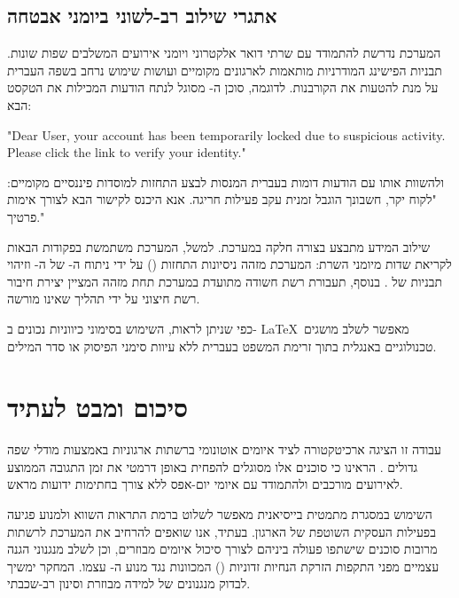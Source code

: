 \documentclass[11pt,a4paper]{article}
\begin{document}
\subsection{אתגרי שילוב רב-לשוני ביומני אבטחה}
המערכת נדרשת להתמודד עם שרתי דואר אלקטרוני ויומני אירועים המשלבים שפות שונות. תבניות הפישינג המודרניות מותאמות לארגונים מקומיים ועושות שימוש נרחב בשפה העברית על מנת להטעות את הקורבנות. לדוגמה, סוכן ה- מסוגל לנתח הודעות המכילות את הטקסט הבא:
\begin{otherlanguage}{english}
"Dear User, your account has been temporarily locked due to suspicious activity. Please click the link to verify your identity."
\end{otherlanguage}
ולהשוות אותו עם הודעות דומות בעברית המנסות לבצע התחזות למוסדות פיננסיים מקומיים:
"לקוח יקר, חשבונך הוגבל זמנית עקב פעילות חריגה. אנא היכנס לקישור הבא לצורך אימות פרטיך."

שילוב המידע מתבצע בצורה חלקה במערכת. למשל, המערכת משתמשת בפקודות הבאות לקריאת שדות מיומני השרת:
המערכת מזהה ניסיונות התחזות () על ידי ניתוח ה- של ה- וזיהוי תבניות של . בנוסף, תעבורת רשת חשודה מתועדת במערכת  תחת מזהה  המציין יצירת חיבור רשת חיצוני על ידי תהליך שאינו מורשה.

כפי שניתן לראות, השימוש בסימוני כיווניות נכונים ב- \LaTeX\ מאפשר לשלב מושגים טכנולוגיים באנגלית בתוך זרימת המשפט בעברית ללא עיוות סימני הפיסוק או סדר המילים.

\section{סיכום ומבט לעתיד}
עבודה זו הציגה ארכיטקטורה לציד איומים אוטונומי ברשתות ארגוניות באמצעות מודלי שפה גדולים \cite{Zohar2024}. הראינו כי סוכנים אלו מסוגלים להפחית באופן דרמטי את זמן התגובה הממוצע לאירועים מורכבים ולהתמודד עם איומי יום-אפס ללא צורך בחתימות ידועות מראש.

השימוש במסגרת מתמטית בייסיאנית מאפשר לשלוט ברמת התראות השווא ולמנוע פגיעה בפעילות העסקית השוטפת של הארגון. בעתיד, אנו שואפים להרחיב את המערכת לרשתות מרובות סוכנים שישתפו פעולה ביניהם לצורך סיכול איומים מבוזרים, וכן לשלב מנגנוני הגנה עצמיים מפני התקפות הזרקת הנחיות זדוניות () המכוונות נגד מנוע ה- עצמו. המחקר ימשיך לבדוק מנגנונים של למידה מבוזרת וסינון רב-שכבתי.

\newpage
\printbibliography[title={מקורות}]
\end{document}
